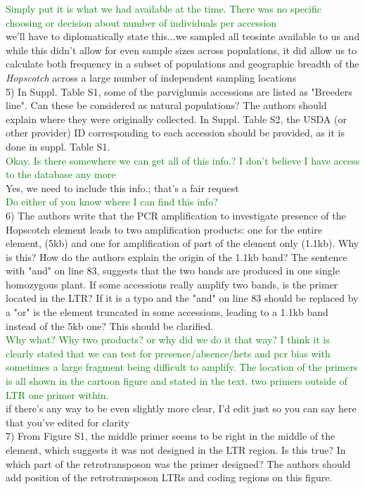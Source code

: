 \documentclass[11pt]{article}
\newcommand{\lev}[1]{\noindent \textcolor{green}{{#1}} \\}
\newcommand{\mbh}[1]{\noindent \textcolor{Dandelion}{{#1}}\\}
\begin{document}
\lev{Simply put it is what we had available at the time. There was no specific choosing or decision about number of individuals per accession}
\mbh{we'll have to diplomatically state this...we sampled all teosinte available to us and while this didn't allow for even sample sizes across populations, it did allow us to calculate both frequency in a subset of populations and geographic breadth of the \emph{Hopscotch} across a large number of independent sampling locations}

5) In Suppl. Table S1, some of the parviglumis accessions are listed as "Breeders line". Can these be considered as natural populations? The authors should explain where they were originally collected. In Suppl. Table S2, the USDA (or other provider) ID corresponding to each accession should be provided, as it is done in suppl. Table S1.\\

\lev{Okay. Is there somewhere we can get all of this info.? I don't believe I have access to the database any more}
\mbh{Yes, we need to include this info.; that's a fair request}
\lev{Do either of you know where I can find this info?}

6) The authors write that the PCR amplification to investigate presence of the Hopscotch element leads to two amplification products: one for the entire element, (5kb) and one for amplification of part of the element only (1.1kb). Why is this? How do the authors explain the origin of the 1.1kb band? The sentence with "and" on line 83, suggests that the two bands are produced in one single homozygous plant. If some accessions really amplify two bands, is the primer located in the LTR? If it is a typo and the "and" on line 83 should be replaced by a "or" is the element truncated in some accessions, leading to a 1.1kb band instead of the 5kb one? This should be clarified.\\

\lev{Why what? Why two products? or why did we do it that way? I think it is clearly stated that we can test for presence/absence/hets and pcr bias with sometimes a large fragment being difficult to amplify. The location of the primers is all shown in the cartoon figure and stated in the text. two primers outside of LTR one primer within.}

\mbh{if there's any way to be even slightly more clear, I'd edit just so you can say here that you've edited for clarity}

7) From Figure S1, the middle primer seems to be right in the middle of the element, which suggests it was not designed in the LTR region. Is this true? In which part of the retrotransposon was the primer designed? The authors should add position of the retrotransposon LTRs and coding regions on this figure. \\
\end{document}
